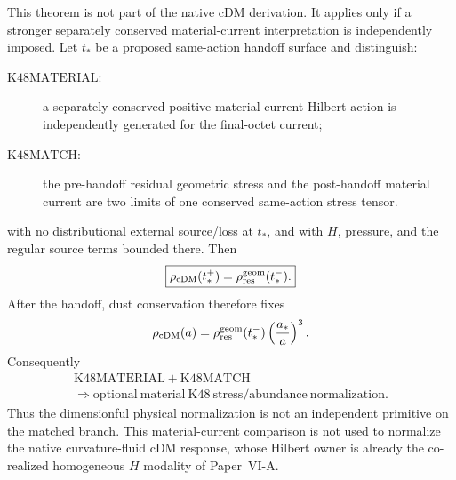 \documentclass[12pt,a4paper]{article}
\begin{document}
\begin{theorem}
\label{p9:thm:conditional-residual-k48-matching}
This theorem is not part of the native cDM derivation.  It applies only if a
stronger separately conserved material-current interpretation is independently
imposed.  Let \(t_*\) be a proposed same-action handoff surface and distinguish:
\begin{description}
\item[\(\mathrm{K48MATERIAL}\):] a separately conserved positive
material-current Hilbert action is independently generated for the final-octet current;
\item[\(\mathrm{K48MATCH}\):] the pre-handoff residual geometric stress and
the post-handoff material current are two limits of one conserved same-action
stress tensor.
\end{description}
with no distributional external source/loss at \(t_*\), and with \(H\),
pressure, and the regular source terms bounded there.  Then
\begin{equation}
 \label{p9:eq:residual-k48-density-matching}
 \boxed{\rho_{\rm cDM}(t_*^+)
 =\rho_{\rm res}^{\rm geom}(t_*^-).}
\end{equation}
After the handoff, dust conservation therefore fixes
\begin{equation}
 \label{p9:eq:k48-normalization-from-matching}
 \rho_{\rm cDM}(a)
 =\rho_{\rm res}^{\rm geom}(t_*^-)
   \left(\frac{a_*}{a}\right)^3.
\end{equation}
Consequently
\begin{equation}
 \label{p9:eq:k48-occ-match-norm-implication}
 \boxed{\begin{gathered}
 \mathrm{K48MATERIAL}+\mathrm{K48MATCH}\\
 \Longrightarrow\mathrm{optional\ material\ K48\ stress/abundance\ normalization}.
 \end{gathered}}
\end{equation}
Thus the dimensionful physical normalization is not an independent primitive
on the matched branch.  This material-current comparison is not used to normalize the native
curvature-fluid cDM response, whose Hilbert owner is already the co-realized
homogeneous $H$ modality of Paper~VI-A.
\end{theorem}
\end{document}
